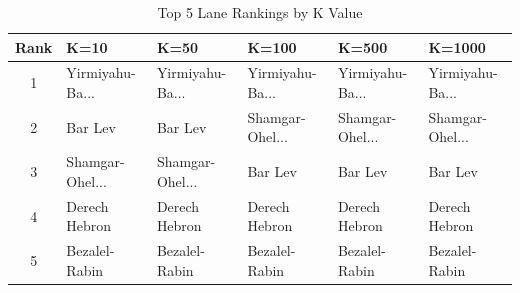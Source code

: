 \begin{table}[H]
\centering
\caption{Top 5 Lane Rankings by K Value}
\label{tab:sensitivity_k}
\begin{tabular}{@{}clllll@{}}
\toprule
\textbf{Rank} & \textbf{K=10} & \textbf{K=50} & \textbf{K=100} & \textbf{K=500} & \textbf{K=1000} \\
\midrule
1 & Yirmiyahu-Ba... & Yirmiyahu-Ba... & Yirmiyahu-Ba... & Yirmiyahu-Ba... & Yirmiyahu-Ba... \\
2 & Bar Lev & Bar Lev & Shamgar-Ohel... & Shamgar-Ohel... & Shamgar-Ohel... \\
3 & Shamgar-Ohel... & Shamgar-Ohel... & Bar Lev & Bar Lev & Bar Lev \\
4 & Derech Hebron & Derech Hebron & Derech Hebron & Derech Hebron & Derech Hebron \\
5 & Bezalel-Rabin & Bezalel-Rabin & Bezalel-Rabin & Bezalel-Rabin & Bezalel-Rabin \\
\bottomrule
\end{tabular}
\end{table}
